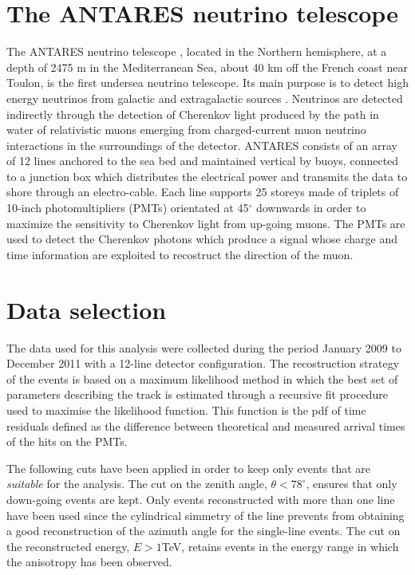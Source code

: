 \documentclass[a4paper]{jpconf}
\begin{document}
\section{The ANTARES neutrino telescope}
The ANTARES neutrino telescope \cite{ageron}, located in the Northern hemisphere, at a depth of 2475 m in the Mediterranean Sea, about 40 km off the French coast near Toulon, is the first undersea neutrino telescope. Its main purpose is to detect high energy neutrinos from galactic and extragalactic sources \cite{point}. Neutrinos are detected indirectly through the detection of Cherenkov light produced by the path in water of relativistic muons emerging from charged-current muon neutrino interactions in the surroundings of the detector. ANTARES consists of an array of 12 lines anchored to the sea bed and maintained vertical by buoys, connected to a junction box which distributes the electrical power and transmits the data to shore through an  electro-cable. Each line supports 25 storeys made of triplets of 10-inch photomultipliers (PMTs) orientated  at  45$^{\circ}$ downwards  in  order  to  maximize  the sensitivity to Cherenkov light from up-going muons. The PMTs are used to detect the Cherenkov photons which produce a signal whose charge and time information are exploited to recostruct the direction of the muon.

\section{Data selection} 
The data used for this analysis were collected during the period January 2009 to December 2011 with a 12-line detector configuration. The recostruction strategy of the events is based on a maximum likelihood method in which the best set of parameters describing the track is estimated through a recursive fit procedure used to maximise the likelihood function. This function is the pdf of time residuals defined as the difference between theoretical and measured arrival times of the hits on the PMTs.  

The following cuts have been applied in order to keep only events that are \emph{suitable} for the analysis. The cut on the zenith angle, $\theta < 78^{\circ}$, ensures that only down-going
events are kept. Only events reconstructed with more than one line have been used since the cylindrical simmetry of the line prevents from obtaining a good reconstruction of the azimuth angle for the single-line events. The cut on the reconstructed energy, $E > 1$TeV, retains events in the energy range in which the anisotropy has been observed.
\end{document}
